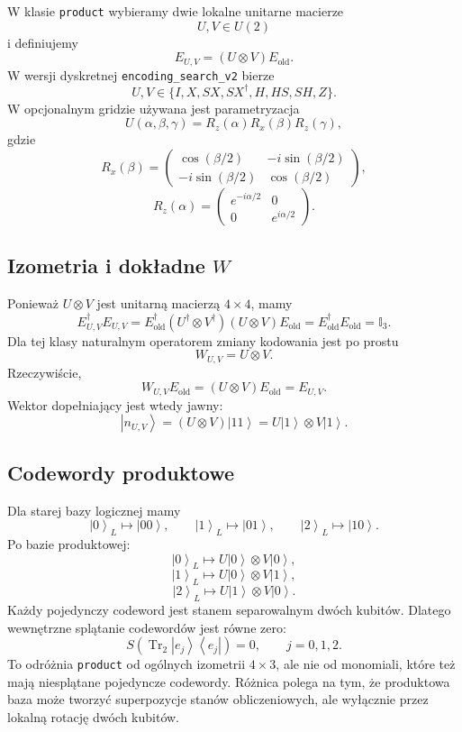 \documentclass[11pt,a4paper]{article}
\newcommand{\id}{\mathbb{I}}
\newcommand{\Eold}{E_{\mathrm{old}}}
\newcommand{\ket}[1]{\left|#1\right\rangle}
\newcommand{\bra}[1]{\left\langle#1\right|}
\begin{document}
W klasie \texttt{product} wybieramy dwie lokalne unitarne macierze
\[
    U,V\in U(2)
\]
i definiujemy
\[
    \boxed{
    E_{U,V}
    =
    (U\otimes V)\Eold
    }.
\]
W wersji dyskretnej \texttt{encoding\_search\_v2} bierze
\[
    U,V\in
    \{I,X,SX,SX^\dagger,H,HS,SH,Z\}.
\]
W opcjonalnym gridzie używana jest parametryzacja
\[
    U(\alpha,\beta,\gamma)
    =
    R_z(\alpha)R_x(\beta)R_z(\gamma),
\]
gdzie
\[
    R_x(\beta)
    =
    \begin{pmatrix}
        \cos(\beta/2) & -i\sin(\beta/2)\\
        -i\sin(\beta/2) & \cos(\beta/2)
    \end{pmatrix},
\]
\[
    R_z(\alpha)
    =
    \begin{pmatrix}
        e^{-i\alpha/2} & 0\\
        0 & e^{i\alpha/2}
    \end{pmatrix}.
\]

\subsection{Izometria i dokładne \(W\)}

Ponieważ \(U\otimes V\) jest unitarną macierzą \(4\times 4\), mamy
\[
    E_{U,V}^\dagger E_{U,V}
    =
    \Eold^\dagger (U^\dagger\otimes V^\dagger)(U\otimes V)\Eold
    =
    \Eold^\dagger\Eold
    =
    \id_3.
\]
Dla tej klasy naturalnym operatorem zmiany kodowania jest po prostu
\[
    \boxed{
    W_{U,V}=U\otimes V
    }.
\]
Rzeczywiście,
\[
    W_{U,V}\Eold=(U\otimes V)\Eold=E_{U,V}.
\]
Wektor dopełniający jest wtedy jawny:
\[
    \ket{n_{U,V}}
    =
    (U\otimes V)\ket{11}
    =
    U\ket{1}\otimes V\ket{1}.
\]

\subsection{Codewordy produktowe}

Dla starej bazy logicznej mamy
\[
    \ket{0}_L\mapsto \ket{00},
    \qquad
    \ket{1}_L\mapsto \ket{01},
    \qquad
    \ket{2}_L\mapsto \ket{10}.
\]
Po bazie produktowej:
\[
    \ket{0}_L
    \mapsto
    U\ket{0}\otimes V\ket{0},
\]
\[
    \ket{1}_L
    \mapsto
    U\ket{0}\otimes V\ket{1},
\]
\[
    \ket{2}_L
    \mapsto
    U\ket{1}\otimes V\ket{0}.
\]
Każdy pojedynczy codeword jest stanem separowalnym dwóch kubitów. Dlatego
wewnętrzne splątanie codewordów jest równe zero:
\[
    S\!\left(\operatorname{Tr}_2\ket{e_j}\bra{e_j}\right)=0,
    \qquad j=0,1,2.
\]
To odróżnia \texttt{product} od ogólnych izometrii \(4\times 3\), ale nie od
monomiali, które też mają niesplątane pojedyncze codewordy. Różnica polega na
tym, że produktowa baza może tworzyć superpozycje stanów obliczeniowych, ale
wyłącznie przez lokalną rotację dwóch kubitów.
\end{document}
